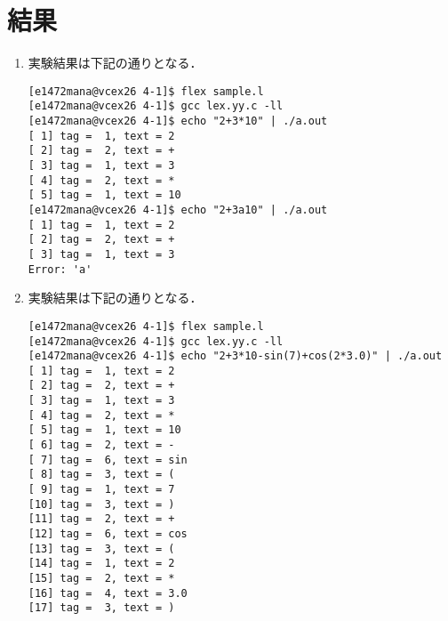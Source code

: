 \documentclass[a4j]{jsarticle}  %
\begin{document}
\section{結果}
\begin{enumerate}
\item 実験結果は下記の通りとなる．
  \begin{screen}
\begin{verbatim}
[e1472mana@vcex26 4-1]$ flex sample.l
[e1472mana@vcex26 4-1]$ gcc lex.yy.c -ll
[e1472mana@vcex26 4-1]$ echo "2+3*10" | ./a.out
[ 1] tag =  1, text = 2
[ 2] tag =  2, text = +
[ 3] tag =  1, text = 3
[ 4] tag =  2, text = *
[ 5] tag =  1, text = 10
[e1472mana@vcex26 4-1]$ echo "2+3a10" | ./a.out
[ 1] tag =  1, text = 2
[ 2] tag =  2, text = +
[ 3] tag =  1, text = 3
Error: 'a'
\end{verbatim}
  \end{screen}

\item 実験結果は下記の通りとなる．
\begin{screen}
\begin{verbatim}
[e1472mana@vcex26 4-1]$ flex sample.l
[e1472mana@vcex26 4-1]$ gcc lex.yy.c -ll
[e1472mana@vcex26 4-1]$ echo "2+3*10-sin(7)+cos(2*3.0)" | ./a.out
[ 1] tag =  1, text = 2
[ 2] tag =  2, text = +
[ 3] tag =  1, text = 3
[ 4] tag =  2, text = *
[ 5] tag =  1, text = 10
[ 6] tag =  2, text = -
[ 7] tag =  6, text = sin
[ 8] tag =  3, text = (
[ 9] tag =  1, text = 7
[10] tag =  3, text = )
[11] tag =  2, text = +
[12] tag =  6, text = cos
[13] tag =  3, text = (
[14] tag =  1, text = 2
[15] tag =  2, text = *
[16] tag =  4, text = 3.0
[17] tag =  3, text = )
\end{verbatim}
\end{screen}
\end{enumerate}
\end{document}
